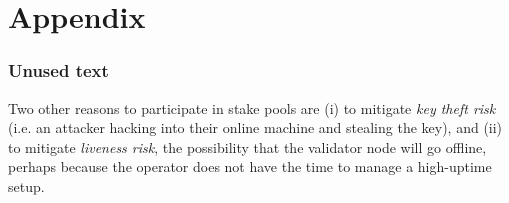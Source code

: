 
\clearpage
\part*{Appendix}

\section{Unused text}


Two other reasons to participate in stake pools are (i) to mitigate \emph{key theft risk} (i.e. an attacker hacking into their online machine and stealing the key), and (ii) to mitigate \emph{liveness risk}, the possibility that the validator node will go offline, perhaps because the operator does not have the time to manage a high-uptime setup.

